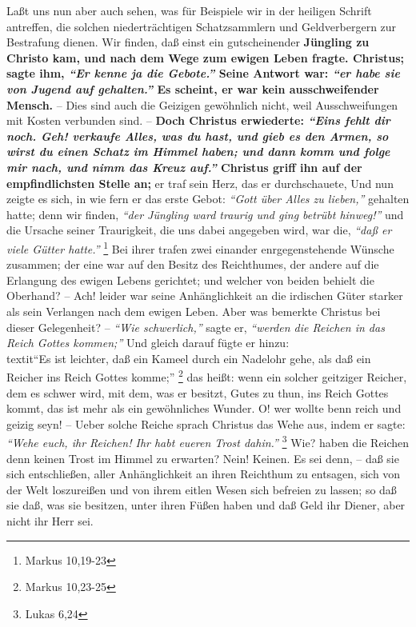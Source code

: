 Laßt uns nun aber auch sehen, was für Beispiele wir in der heiligen Schrift
antreffen, die solchen niederträchtigen Schatzsammlern und Geldverbergern zur
Bestrafung dienen. Wir finden, daß einst ein gutscheinender \textbf{Jüngling zu Christo
kam, und nach dem Wege zum ewigen Leben fragte. Christus; sagte ihm,
\textit{"`Er kenne ja die Gebote."'} Seine Antwort war:
\textit{"`er habe sie von Jugend auf gehalten."'} Es
scheint, er war kein ausschweifender Mensch.} -- Dies sind auch die Geizigen
gewöhnlich nicht, weil Ausschweifungen mit Kosten verbunden sind. -- \textbf{Doch
Christus erwiederte:
\textit{"`Eins fehlt dir noch. Geh! verkaufe Alles, was du hast,
und gieb es den Armen, so wirst du einen Schatz im Himmel haben; und dann komm
und folge mir nach, und nimm das Kreuz auf."'} Christus griff ihn auf der
empfindlichsten Stelle an;} er traf sein Herz, das er durchschauete, Und nun
zeigte es sich, in wie fern er das erste Gebot: \textit{"`Gott über Alles zu lieben,"'}
gehalten hatte; denn wir finden, \textit{"`der Jüngling ward traurig und ging betrübt
hinweg!"'} und die Ursache seiner Traurigkeit, die uns dabei angegeben wird, war
die,
\textit{"`daß er viele Gütter hatte."'}
\footnote{Markus 10,19-23}
Bei ihrer trafen
zwei einander enrgegenstehende Wünsche zusammen; der eine war auf den Besitz des
Reichthumes, der andere auf die Erlangung des ewigen Lebens gerichtet; und
welcher von beiden behielt die Oberhand? -- Ach! leider war seine Anhänglichkeit
an die irdischen Güter starker als sein Verlangen nach dem ewigen Leben. Aber
was bemerkte Christus bei dieser Gelegenheit? -- \textit{"`Wie schwerlich,"'} sagte er,
\textit{"`werden die Reichen in das Reich Gottes kommen;"'} Und gleich darauf fügte er
hinzu:\\textit{"`Es ist leichter, daß ein Kameel durch ein Nadelohr gehe, als daß ein
Reicher ins Reich Gottes komme;"'}
\footnote{Markus 10,23-25}
das heißt: wenn ein
solcher geitziger Reicher, dem es schwer wird, mit dem, was er besitzt, Gutes zu
thun, ins Reich Gottes kommt, das ist mehr als ein gewöhnliches Wunder. O! wer
wollte benn reich und geizig seyn! -- Ueber solche Reiche sprach Christus das
Wehe aus, indem er sagte: \textit{"`Wehe euch, ihr Reichen! Ihr habt eueren Trost
dahin."'}
\footnote{Lukas 6,24}
Wie? haben die Reichen denn keinen Trost im
Himmel zu erwarten? Nein! Keinen. Es sei denn, -- daß sie sich entschließen,
aller Anhänglichkeit an ihren Reichthum zu entsagen, sich von der Welt
loszureißen und von ihrem eitlen Wesen sich befreien zu lassen; so daß sie daß,
was sie besitzen, unter ihren Füßen haben und daß Geld ihr Diener, aber nicht
ihr Herr sei.

